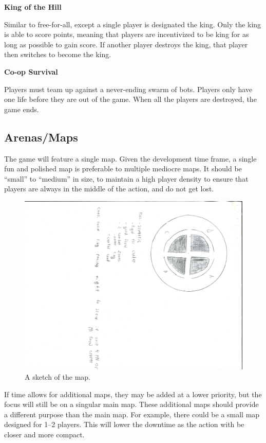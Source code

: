 \documentclass{article}
\theoremstyle{definition}
\begin{document}
\textbf{\textbf{King of the Hill}}

Similar to free-for-all, except a single player is designated the king. Only
the king is able to score points, meaning that players are incentivized to be
king for as long as possible to gain score. If another player destroys the
king, that player then switches to become the king.

\textbf{Co-op Survival}

Players must team up against a never-ending swarm of bots. Players only have
one life before they are out of the game. When all the players are destroyed,
the game ends.
\subsection{Arenas/Maps}

The game will feature a single map. Given the development time frame, a single
fun and polished map is preferable to multiple mediocre maps. It should be
``small'' to ``medium'' in size, to maintain a high player density to ensure
that players are always in the middle of the action, and do not get lost.

\begin{figure}[htpb]
  \centering
  \includegraphics[width=0.8\linewidth]{austin_map1.pdf}
  \caption{A sketch of the map.}
\label{fig:austin_map1}
\end{figure}

If time allows for additional maps, they may be added at a lower priority, but
the focus will still be on a singular main map. These additional maps should
provide a different purpose than the main map. For example, there could be
a small map designed for 1--2 players. This will lower the downtime as the
action with be closer and more compact.
\end{document}
